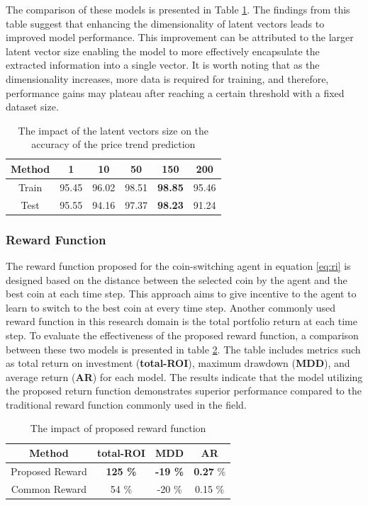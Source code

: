 The comparison of these models is presented in Table \ref{tbl:FE-dim}. The findings from this table suggest that enhancing the dimensionality of latent vectors leads to improved model performance. This improvement can be attributed to the larger latent vector size enabling the model to more effectively encapsulate the extracted information into a single vector. It is worth noting that as the dimensionality increases, more data is required for training, and therefore, performance gains may plateau after reaching a certain threshold with a fixed dataset size.


\begin{table}[h]
	\centering
	\caption{The impact of the latent vectors size on the accuracy of the price trend prediction}
	\label{tbl:FE-dim}
	\begin{tabular}{c | c | c | c | c | c }
		Method & 1 & 10 & 50 & 150 & 200 \\
		\hline
		\hline
		Train & 95.45& 96.02 & 98.51 & \textbf{98.85} & 95.46\\
		Test & 95.55& 94.16 & 97.37 & \textbf{98.23} & 91.24\\
	\end{tabular}
\end{table}

\subsubsection{Reward Function}
The reward function proposed for the coin-switching agent in equation \ref{eq:ri} is designed based on the distance between the selected coin by the agent and the best coin at each time step. This approach aims to give incentive to the agent to learn to switch to the best coin at every time step. Another commonly used reward function in this research domain is the total portfolio return at each time step. To evaluate the effectiveness of the proposed reward function, a comparison between these two models is presented in table \ref{tbl:rewards}. The table includes metrics such as total return on investment (\textbf{total-ROI}), maximum drawdown (\textbf{MDD}), and average return (\textbf{AR}) for each model. The results indicate that the model utilizing the proposed return function demonstrates superior performance compared to the traditional reward function commonly used in the field.


\begin{table}[h]
	\centering
	\caption{The impact of proposed reward function}
	\label{tbl:rewards}
	\begin{tabular}{c | c | c | c  }
		Method & total-ROI & MDD & AR \\
		\hline
		\hline
		Proposed Reward & \textbf{125 \%}  & \textbf{-19 \%} & \textbf{0.27}  \% \\
		Common Reward & 54 \%  & -20 \%  & 0.15 \%\\
	\end{tabular}
\end{table}

